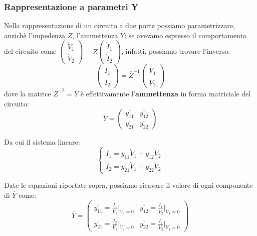 \documentclass[a4paper,11pt]{article}
\begin{document}
\subsubsection{Rappresentazione a parametri Y}
Nella rappresentazione di un circuito a due porte possiamo parametrizzare, anzichè l'impedenza $\overline{Z}$, l'ammettenza $\overline{Y}$: se avevamo espresso il comportamento del circuito come $
\begin{pmatrix}
	\dot{V}_1 \\ \dot{V}_2
\end{pmatrix}
= \overline{Z}
\begin{pmatrix}
	\dot{I}_1 \\ \dot{I}_2
\end{pmatrix}
$, infatti, possiamo trovare l'inverso:
$$
\begin{pmatrix}
	\dot{I}_1 \\ \dot{I}_2
\end{pmatrix}
= \overline{Z}^{-1}
\begin{pmatrix}
	\dot{V}_1 \\ \dot{V}_2
\end{pmatrix}
$$
dove la matrice $\overline{Z}^{-1} = \overline{Y}$ è effettivamente l'\textbf{ammettenza} in forma matriciale del circuito:
$$
\overline{Y} =
\begin{pmatrix}
	\overline{y_{11}} & \overline{y_{12}} \\ 
	\overline{y_{21}} & \overline{y_{22}}
\end{pmatrix}
$$

Da cui il sistema lineare:
\[
	\begin{cases}
		\dot{I}_1 = \overline{y_{11}} \dot{V}_1 + \overline{y_{12}} \dot{V}_2 \\ 	
		\dot{I}_2 = \overline{y_{21}} \dot{V}_1 + \overline{y_{22}} \dot{V}_2 	
	\end{cases}
\]

Date le equazioni riportate sopra, possiamo ricavare il valore di ogni componente di $\overline{Y}$ come:
$$
\overline{Y} =
\begin{pmatrix}
	\overline{y_{11}} = \frac{\dot{I}_1}{\dot{V}_1} \Big|_{\dot{V}_2 = 0} &
	\overline{y_{12}} = \frac{\dot{I}_1}{\dot{V}_2} \Big|_{\dot{V}_1 = 0} \\
	\overline{y_{21}} = \frac{\dot{I}_2}{\dot{V}_1} \Big|_{\dot{V}_2 = 0} &
	\overline{y_{22}} = \frac{\dot{I}_2}{\dot{V}_2} \Big|_{\dot{V}_1 = 0}
\end{pmatrix}
$$
\end{document}

